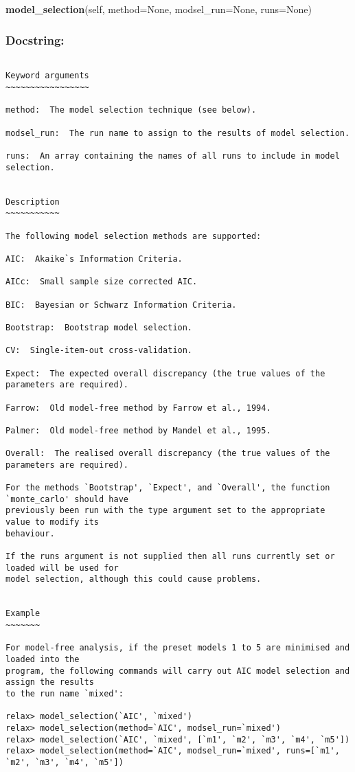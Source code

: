 \textsf{\textbf{model\_selection}(self, method=None, modsel\_run=None, runs=None)
}


\subsubsection{Docstring:}

{\scriptsize
\begin{verbatim}

Keyword arguments
~~~~~~~~~~~~~~~~~

method:  The model selection technique (see below).

modsel_run:  The run name to assign to the results of model selection.

runs:  An array containing the names of all runs to include in model selection.


Description
~~~~~~~~~~~

The following model selection methods are supported:

AIC:  Akaike`s Information Criteria.

AICc:  Small sample size corrected AIC.

BIC:  Bayesian or Schwarz Information Criteria.

Bootstrap:  Bootstrap model selection.

CV:  Single-item-out cross-validation.

Expect:  The expected overall discrepancy (the true values of the parameters are required).

Farrow:  Old model-free method by Farrow et al., 1994.

Palmer:  Old model-free method by Mandel et al., 1995.

Overall:  The realised overall discrepancy (the true values of the parameters are required).

For the methods `Bootstrap', `Expect', and `Overall', the function `monte_carlo' should have
previously been run with the type argument set to the appropriate value to modify its
behaviour.

If the runs argument is not supplied then all runs currently set or loaded will be used for
model selection, although this could cause problems.


Example
~~~~~~~

For model-free analysis, if the preset models 1 to 5 are minimised and loaded into the
program, the following commands will carry out AIC model selection and assign the results
to the run name `mixed':

relax> model_selection(`AIC', `mixed')
relax> model_selection(method=`AIC', modsel_run=`mixed')
relax> model_selection(`AIC', `mixed', [`m1', `m2', `m3', `m4', `m5'])
relax> model_selection(method=`AIC', modsel_run=`mixed', runs=[`m1', `m2', `m3', `m4', `m5'])
\end{verbatim}
}



